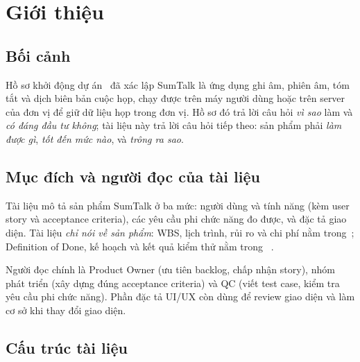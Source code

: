 \documentclass[12pt,a4paper]{report}
\begin{document}
\cleardoublepage{}
{}
\listoffigures

\cleardoublepage{}
{}
\listoftables

\chapter{Giới thiệu}
\label{chap:intro}

\section{Bối cảnh}

Hồ sơ khởi động dự án~\cite{pid} đã xác lập SumTalk là ứng dụng ghi âm, phiên âm, tóm tắt và dịch biên bản
cuộc họp, chạy được trên máy người dùng hoặc trên server của đơn vị để giữ dữ liệu họp trong đơn vị. Hồ sơ đó
trả lời câu hỏi \emph{vì sao} làm và \emph{có đáng đầu tư không}; tài liệu này trả lời câu hỏi tiếp theo:
sản phẩm phải \emph{làm được gì}, \emph{tốt đến mức nào}, và \emph{trông ra sao}.

\section{Mục đích và người đọc của tài liệu}

Tài liệu mô tả sản phẩm SumTalk ở ba mức: người dùng và tính năng (kèm user story và acceptance criteria),
các yêu cầu phi chức năng đo được, và đặc tả giao diện. Tài liệu \emph{chỉ nói về sản phẩm}: WBS, lịch trình,
rủi ro và chi phí nằm trong~\cite{pmp}; Definition of Done, kế hoạch và kết quả kiểm thử nằm trong
~\cite{qtd}.

Người đọc chính là Product Owner (ưu tiên backlog, chấp nhận story), nhóm phát triển (xây dựng đúng
acceptance criteria) và QC (viết test case, kiểm tra yêu cầu phi chức năng). Phần đặc tả UI/UX còn dùng để
review giao diện và làm cơ sở khi thay đổi giao diện.

\section{Cấu trúc tài liệu}
\end{document}
